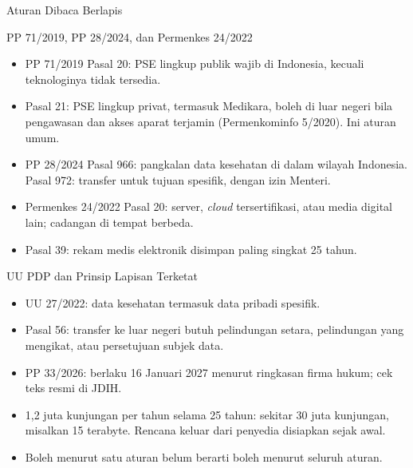 \documentclass[aspectratio=169, table, 12pt]{beamer}
\begin{document}
\begin{frame}{Aturan Dibaca Berlapis}
  \begin{center}
  \end{center}
\end{frame}

\begin{frame}{PP 71/2019, PP 28/2024, dan Permenkes 24/2022}
  \small
  \begin{itemize}
    \item PP 71/2019 Pasal 20: PSE lingkup publik wajib di Indonesia, kecuali teknologinya
          tidak tersedia.
    \item Pasal 21: PSE lingkup privat, termasuk Medikara, boleh di luar negeri bila pengawasan dan
          akses aparat terjamin (Permenkominfo 5/2020). Ini aturan umum.
    \item PP 28/2024 Pasal 966: pangkalan data kesehatan di dalam wilayah Indonesia. Pasal 972:
          transfer untuk tujuan spesifik, dengan izin Menteri.
    \item Permenkes 24/2022 Pasal 20: server, \textit{cloud} tersertifikasi, atau media
          digital lain; cadangan di tempat berbeda.
    \item Pasal 39: rekam medis elektronik disimpan paling singkat 25 tahun.
  \end{itemize}
\end{frame}

\begin{frame}{UU PDP dan Prinsip Lapisan Terketat}
  \small
  \begin{itemize}
    \item UU 27/2022: data kesehatan termasuk data pribadi spesifik.
    \item Pasal 56: transfer ke luar negeri butuh pelindungan setara, pelindungan yang
          mengikat, atau persetujuan subjek data.
    \item PP 33/2026: berlaku 16 Januari 2027 menurut ringkasan firma hukum; cek teks resmi
          di JDIH.
    \item 1,2 juta kunjungan per tahun selama 25 tahun: sekitar 30 juta kunjungan, misalkan
          15 terabyte. Rencana keluar dari penyedia disiapkan sejak awal.
    \item Boleh menurut satu aturan belum berarti boleh menurut seluruh aturan.
  \end{itemize}
\end{frame}
\end{document}
